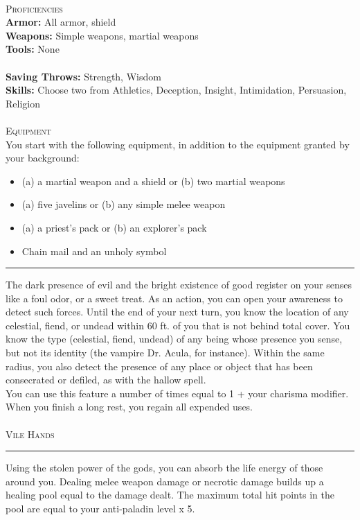 \documentclass[22pt,a4paper]{article}
\newcommand{\HRule}[2]{\par
  \vspace*{\dimexpr-\parskip-\baselineskip+#2}
  \begingroup
  	\color{sepcol}
  	\noindent\rule{\linewidth}{#1}\par
  \endgroup  
  \vspace*{\dimexpr-\parskip-.5\baselineskip+#2}}
\begin{document}
\begin{multicols*}{2}
\\
{\fontsize{12pt}{12pt}\textcolor{title}{\textsc{Proficiencies}}}\\
\textbf{Armor: }All armor, shield\\
\textbf{Weapons: }Simple weapons, martial weapons\\
\textbf{Tools: }None\\
\\
\textbf{Saving Throws: }Strength, Wisdom\\
\textbf{Skills: }Choose two from Athletics, Deception, Insight, Intimidation, Persuasion, Religion\\
\\
{\fontsize{12pt}{12pt}\textcolor{title}{\textsc{Equipment}}}\\
You start with the following equipment, in addition to the equipment granted by your background:
\begin{itemize}
\setlength\itemsep{-6pt}
\item (a) a martial weapon and a shield or (b) two martial weapons
\item (a) five javelins or (b) any simple melee weapon
\item (a) a priest's pack or (b) an explorer's pack
\item Chain mail and an unholy symbol
\end{itemize}
\newpage
{}
\HRule{1pt}{8pt}
The dark presence of evil and the bright existence of good register on your senses like a foul odor, or a sweet treat. As an action, you can open your awareness to detect such forces. Until the end of your next turn, you know the location of any celestial, fiend, or undead within 60 ft. of you that is not behind total cover. You know the type (celestial, fiend, undead) of any being whose presence you sense, but not its identity (the vampire Dr. Acula, for instance). Within the same radius, you also detect the presence of any place or object that has been consecrated or defiled, as with the hallow spell. \\
\indent You can use this feature a number of times equal to 1 + your charisma modifier. When you finish a long rest, you regain all expended uses. \\
\\
{\fontsize{14pt}{14pt}\textcolor{title}{\textsc{Vile Hands}}}
\HRule{1pt}{8pt}
\noindent Using the stolen power of the gods, you can absorb the life energy of those around you. Dealing melee weapon damage or necrotic damage builds up a healing pool equal to the damage dealt. The maximum total hit points in the pool are equal to your anti-paladin level x 5.\\

\end{multicols*}
\end{document}
